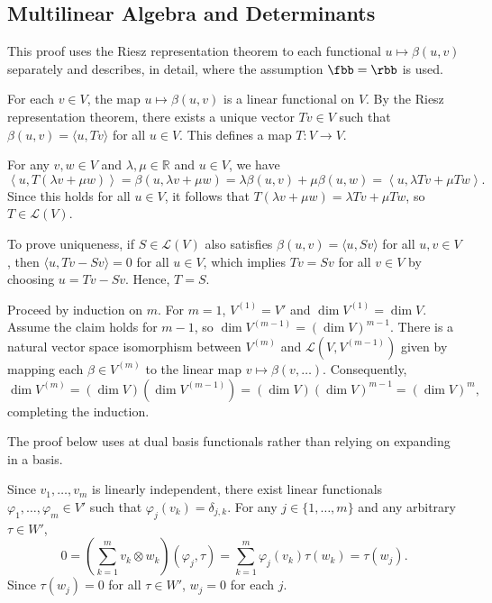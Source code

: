 \subsection{Multilinear Algebra and Determinants}


This proof uses the Riesz representation theorem to each functional $u \mapsto \beta(u, v)$ separately and describes, in detail, where the assumption $\fbb = \rbb$ is used.

\begin{csp}
    For each $v \in V$, the map $u \mapsto \beta(u,v)$ is a linear functional on $V$. By the Riesz representation theorem, there exists a unique vector $Tv \in V$ such that $\beta(u,v)=\langle u, Tv \rangle$ for all $u \in V$. This defines a map $T:V \to V$.

    For any $v,w \in V$ and $\lambda, \mu \in \mathbb{R}$ and $u \in V$, we have
    $$\left \langle u, T(\lambda v+\mu w) \right \rangle=\beta(u,\lambda v+\mu w)=\lambda \beta(u,v)+\mu \beta(u,w)=\left \langle u, \lambda Tv+\mu Tw \right \rangle.$$
    Since this holds for all $u \in V$, it follows that $T(\lambda v+\mu w)=\lambda Tv+\mu Tw$, so $T \in \mathcal{L}(V)$.

    To prove uniqueness, if $S \in \mathcal{L}(V)$ also satisfies $\beta(u,v)=\langle u, Sv \rangle$ for all $u,v \in V$, then $\langle u, Tv-Sv \rangle=0$ for all $u \in V$, which implies $Tv=Sv$ for all $v \in V$ by choosing $u=Tv-Sv$. Hence, $T=S$.
\end{csp}


\begin{csp}
    Proceed by induction on $m$. For $m=1$, $V^{(1)}=V'$ and $\dim V^{(1)}=\dim V$. Assume the claim holds for $m-1$, so $\dim V^{(m-1)}=(\dim V)^{m-1}$. There is a natural vector space isomorphism between $V^{(m)}$ and $\mathcal{L}\left(V,V^{(m-1)} \right)$ given by mapping each $\beta \in V^{(m)}$ to the linear map $v \mapsto \beta(v,\dots)$. Consequently,
    $$\dim V^{(m)}=(\dim V)(\dim V^{(m-1)})=(\dim V)(\dim V)^{m-1}=(\dim V)^m,$$
    completing the induction.
\end{csp}


The proof below uses at dual basis functionals rather than relying on expanding in a basis.

\begin{csp}
    Since $v_1, \dots, v_m$ is linearly independent, there exist linear functionals $\varphi_1, \dots, \varphi_m \in V'$ such that $\varphi_j(v_k) = \delta_{j,k}$. For any $j \in \{1, \dots, m\}$ and any arbitrary $\tau \in W'$, 
    $$0 = \left(\sum_{k=1}^m v_k \otimes w_k\right)(\varphi_j, \tau) = \sum_{k=1}^m \varphi_j(v_k)\tau(w_k) = \tau(w_j).$$
    Since $\tau(w_j) = 0$ for all $\tau \in W'$, $w_j = 0$ for each $j$.
\end{csp}

